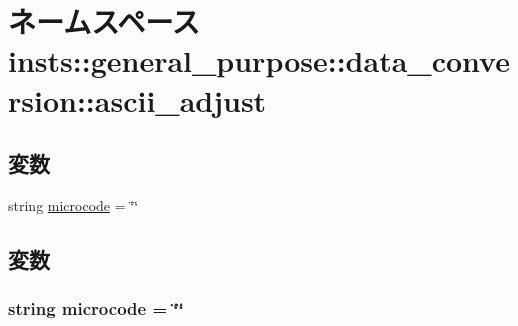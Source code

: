 \hypertarget{namespaceinsts_1_1general__purpose_1_1data__conversion_1_1ascii__adjust}{
\section{ネームスペース insts::general\_\-purpose::data\_\-conversion::ascii\_\-adjust}
\label{namespaceinsts_1_1general__purpose_1_1data__conversion_1_1ascii__adjust}
}
\subsection*{変数}
\begin{DoxyCompactItemize}
\item 
string \hyperlink{namespaceinsts_1_1general__purpose_1_1data__conversion_1_1ascii__adjust_a770f11a173e99389a8802f0107ed8f52}{microcode} = \char`\"{}\char`\"{}
\end{DoxyCompactItemize}


\subsection{変数}
\hypertarget{namespaceinsts_1_1general__purpose_1_1data__conversion_1_1ascii__adjust_a770f11a173e99389a8802f0107ed8f52}{
\subsubsection[{microcode}]{\setlength{\rightskip}{0pt plus 5cm}string {\bf microcode} = \char`\"{}\char`\"{}}}
\label{namespaceinsts_1_1general__purpose_1_1data__conversion_1_1ascii__adjust_a770f11a173e99389a8802f0107ed8f52}
